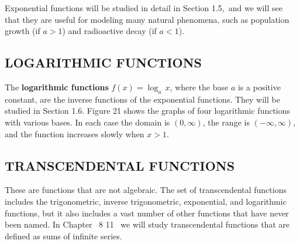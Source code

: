 \documentclass{sebase}
\begin{document}
Exponential functions will be studied in detail in Section 1.5,\ and we will
see that they are useful for modeling many natural phenomena, such as
population growth (if $a>1$) and radioactive decay (if $a<1$).\vspace*{9pt}

\subsection{LOGARITHMIC FUNCTIONS\protect\vspace*{-8pt}}

The \textbf{logarithmic functions} $f(x)=\log _{a}\,x$, where the base $a$
is a positive constant, are the inverse functions of the exponential
functions. They will be studied in Section 1.6. Figure 21 shows the graphs
of four logarithmic functions with various bases. In each case the domain is 
$(0,\infty )$, the range is $(-\infty ,\infty )$, and the function increases
slowly when $x>1$.\\[4pt]
\hspace*{\fill}\hspace*{\fill}\vspace*{8pt%
}

\subsection{TRANSCENDENTAL FUNCTIONS\protect\vspace*{-8pt}}

These are functions that are not algebraic. The set of transcendental
functions includes the trigonometric, inverse trigonometric, exponential,
and logarithmic functions, but it also includes a vast number of other
functions that have never been named. In Chapter~%
\ifnum{} 8\else \ifnum{} 11\fi \fi%
~we will study transcendental functions that are defined as sums of infinite
series.
\end{document}
